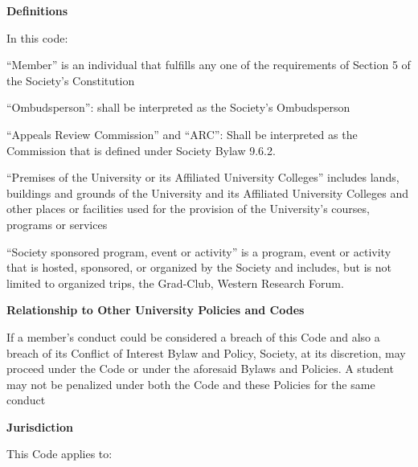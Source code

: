 \begin{longenum}[ label*=\arabic*., align=left]
\begin{longenum}[ label*=\arabic*., align=left]
     \end{longenum}
     \item \textbf{Definitions}
     
     In this code:
     \begin{longenum}[ label*=\arabic*., align=left]
     \item ``Member'' is an individual that fulfills any one of the requirements of Section 5 of the Society's 
Constitution
     \item ``Ombudsperson'': shall be interpreted as the Society's Ombudsperson
     \item ``Appeals  Review  Commission''  and  ``ARC'':  Shall  be  interpreted  as  the  Commission  that  is defined under Society Bylaw 9.6.2.
     \item ``Premises  of  the  University  or  its  Affiliated  University  Colleges''  includes  lands,  buildings  and grounds of the University and its Affiliated University Colleges and other places or facilities used for the provision of the University’s courses, programs or services
     \item ``Society sponsored program, event or activity'' is a program, event or activity that  is hosted, sponsored,  or  organized  by  the Society  and  includes,  but  is  not  limited  to  organized  trips,  the  Grad-Club, Western Research Forum.

     \end{longenum}
\item \textbf{Relationship to Other University Policies and Codes}
     \begin{longenum}[ label*=\arabic*., align=left]
           \item If a member's conduct could be considered a breach of this Code and also a breach of its Conflict  of  Interest  Bylaw  and  Policy, Society, at its discretion, may proceed under the Code or under the aforesaid Bylaws and Policies. A student may not be penalized under both the Code and these Policies for the same conduct
     \end{longenum}
\item \textbf{Jurisdiction}
     \begin{longenum}[ label*=\arabic*., align=left]
           \item This Code applies to:


\end{longenum}
\end{longenum}
